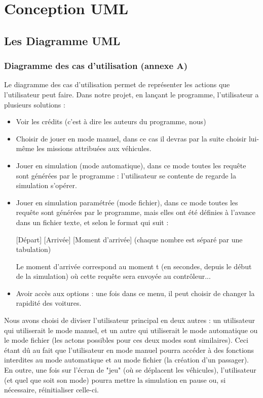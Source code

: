 \documentclass[a4paper, titlepage]{report}
\begin{document}
\part{Conception UML}

\chapter{Les Diagramme UML}
\section{Diagramme des cas d'utilisation (annexe A)}
\hspace{0.5cm} Le diagramme des cas d'utilisation permet de représenter les actions que l'utilisateur peut faire. Dans notre projet, en lançant le programme, l'utilisateur a plusieurs solutions :
\begin{itemize}
\item Voir les crédits (c'est à dire les auteurs du programme, nous)
\item Choisir de jouer en mode manuel, dans ce cas il devras par la suite choisir lui-même les missions attribuées aux véhicules.
\item Jouer en simulation (mode automatique), dans ce mode toutes les requête sont générées par le programme : l'utilisateur se contente de regarde la simulation s'opérer.
\item Jouer en simulation paramétrée (mode fichier), dans ce mode toutes les requête sont générées par le programme, mais elles ont été définies à l'avance dans un fichier texte, et selon le format qui suit :
\vspace{0.1cm}
\begin{center}
[Départ]	[Arrivée]	[Moment d'arrivée] (chaque nombre est séparé par une tabulation)
\end{center}
\vspace{0.1cm}
Le moment d'arrivée correspond au moment t (en secondes, depuis le début de la simulation) où cette requête sera envoyée au contrôleur...


\item Avoir accès aux options : une fois dans ce menu, il peut choisir de changer la rapidité des voitures.
\end{itemize}
Nous avons choisi de diviser l'utilisateur principal en deux autres : un utilisateur qui utiliserait le mode manuel, et un autre qui utiliserait le mode automatique ou le mode fichier (les actons possibles pour ces deux modes sont similaires). Ceci étant dû au fait que l'utilisateur en mode manuel pourra accéder à des fonctions interdites au mode automatique et au mode fichier (la création d'un passager).\\
En outre, une fois sur l'écran de "jeu" (où se déplacent les véhicules), l'utilisateur (et quel que soit son mode) pourra mettre la simulation en pause ou, si nécessaire, réinitialiser celle-ci. 
\end{document}
